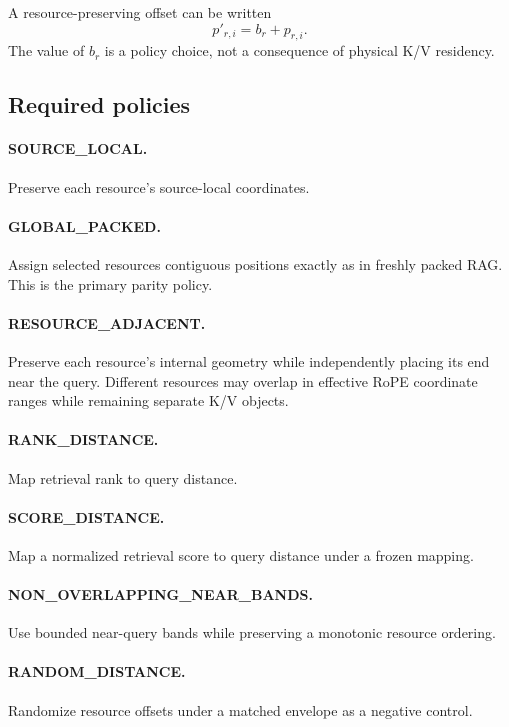 \documentclass[11pt]{article}
\begin{document}
A resource-preserving offset can be written
\[
p'_{r,i}=b_r+p_{r,i}.
\]
The value of $b_r$ is a policy choice, not a consequence of physical K/V residency.

\subsection{Required policies}

\paragraph{SOURCE\_LOCAL.}
Preserve each resource's source-local coordinates.

\paragraph{GLOBAL\_PACKED.}
Assign selected resources contiguous positions exactly as in freshly packed RAG.  This is the primary parity policy.

\paragraph{RESOURCE\_ADJACENT.}
Preserve each resource's internal geometry while independently placing its end near the query.  Different resources may overlap in effective RoPE coordinate ranges while remaining separate K/V objects.

\paragraph{RANK\_DISTANCE.}
Map retrieval rank to query distance.

\paragraph{SCORE\_DISTANCE.}
Map a normalized retrieval score to query distance under a frozen mapping.

\paragraph{NON\_OVERLAPPING\_NEAR\_BANDS.}
Use bounded near-query bands while preserving a monotonic resource ordering.

\paragraph{RANDOM\_DISTANCE.}
Randomize resource offsets under a matched envelope as a negative control.
\end{document}
